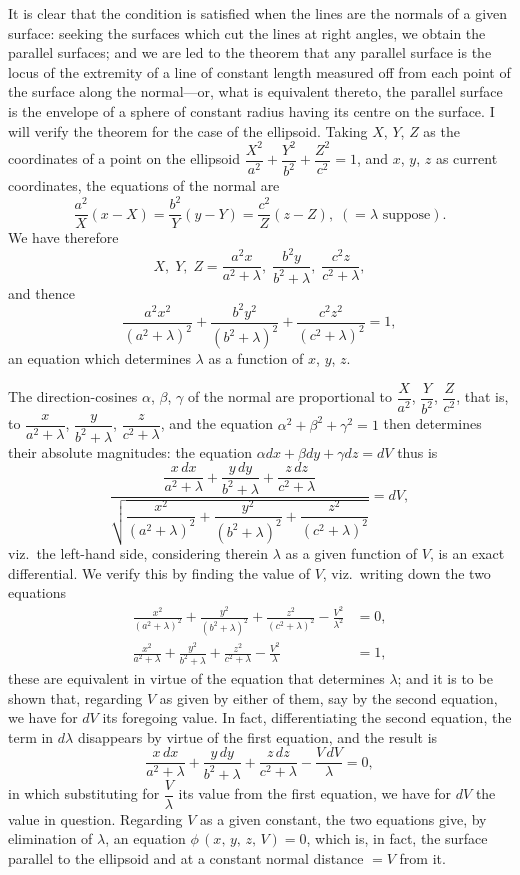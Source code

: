 \documentclass[12pt,a4paper]{article}
\begin{document}
\noindent
It is clear that the condition is satisfied when the lines are the normals of a given surface: seeking the surfaces which cut the lines at right angles, we obtain the parallel surfaces; and we are led to the theorem that any parallel surface is the locus of the extremity of a line of constant length measured off from each point of the surface along the normal---or, what is equivalent thereto, the parallel surface is the envelope of a sphere of constant radius having its centre on the surface. I will verify the theorem for the case of the ellipsoid. Taking $X$, $Y$, $Z$ as the coordinates of a point on the ellipsoid $\dfrac{X^2}{a^2} + \dfrac{Y^2}{b^2} + \dfrac{Z^2}{c^2} = 1$, and $x$, $y$, $z$ as current coordinates, the equations of the normal are
\[
\frac{a^2}{X}(x-X) = \frac{b^2}{Y}(y-Y) = \frac{c^2}{Z}(z-Z),\; (= \lambda \text{ suppose}).
\]
We have therefore
\[
X,\; Y,\; Z = \frac{a^2x}{a^2+\lambda},\; \frac{b^2y}{b^2+\lambda},\; \frac{c^2z}{c^2+\lambda},
\]
and thence
\[
\frac{a^2x^2}{(a^2+\lambda)^2} + \frac{b^2y^2}{(b^2+\lambda)^2} + \frac{c^2z^2}{(c^2+\lambda)^2} = 1,
\]
an equation which determines $\lambda$ as a function of $x$, $y$, $z$.

The direction-cosines $\alpha$, $\beta$, $\gamma$ of the normal are proportional to $\dfrac{X}{a^2}$, $\dfrac{Y}{b^2}$, $\dfrac{Z}{c^2}$, that is, to $\dfrac{x}{a^2+\lambda}$, $\dfrac{y}{b^2+\lambda}$, $\dfrac{z}{c^2+\lambda}$, and the equation $\alpha^2+\beta^2+\gamma^2=1$ then determines their absolute magnitudes: the equation $\alpha dx + \beta dy + \gamma dz = dV$ thus is
\[
\frac{\dfrac{x\,dx}{a^2+\lambda} + \dfrac{y\,dy}{b^2+\lambda} + \dfrac{z\,dz}{c^2+\lambda}}{\sqrt{\dfrac{x^2}{(a^2+\lambda)^2} + \dfrac{y^2}{(b^2+\lambda)^2} + \dfrac{z^2}{(c^2+\lambda)^2}}} = dV,
\]
viz.\ the left-hand side, considering therein $\lambda$ as a given function of $V$, is an exact differential. We verify this by finding the value of $V$, viz.\ writing down the two equations
\begin{align*}
\frac{x^2}{(a^2+\lambda)^2} + \frac{y^2}{(b^2+\lambda)^2} + \frac{z^2}{(c^2+\lambda)^2} - \frac{V^2}{\lambda^2} &= 0, \\
\frac{x^2}{a^2+\lambda} + \frac{y^2}{b^2+\lambda} + \frac{z^2}{c^2+\lambda} - \frac{V^2}{\lambda} &= 1,
\end{align*}
these are equivalent in virtue of the equation that determines $\lambda$; and it is to be shown that, regarding $V$ as given by either of them, say by the second equation, we have for $dV$ its foregoing value. In fact, differentiating the second equation, the term in $d\lambda$ disappears by virtue of the first equation, and the result is
\[
\frac{x\,dx}{a^2+\lambda} + \frac{y\,dy}{b^2+\lambda} + \frac{z\,dz}{c^2+\lambda} - \frac{V\,dV}{\lambda} = 0,
\]
in which substituting for $\dfrac{V}{\lambda}$ its value from the first equation, we have for $dV$ the value in question. Regarding $V$ as a given constant, the two equations give, by elimination of $\lambda$, an equation $\phi\,(x,\,y,\,z,\,V) = 0$, which is, in fact, the surface parallel to the ellipsoid and at a constant normal distance $= V$ from it.
\end{document}
